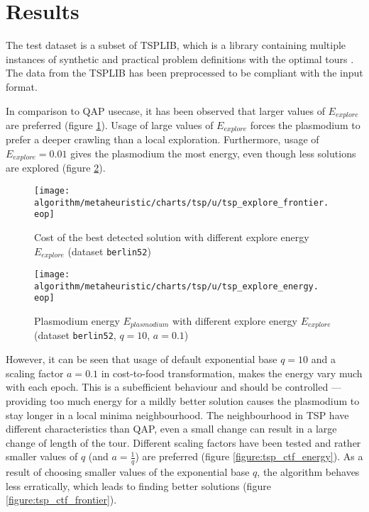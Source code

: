 \section*{Results}

The test dataset is a subset of TSPLIB, which is a library containing multiple instances of synthetic and practical problem definitions with the optimal tours \cite{reinhelt2014tsplib}. The data from the TSPLIB has been preprocessed to be compliant with the input format.

In comparison to QAP usecase, it has been observed that larger values of $E_{explore}$ are preferred (figure \ref{figure:tsp_explore_frontier}). Usage of large values of $E_{explore}$ forces the plasmodium to prefer a deeper crawling than a local exploration. Furthermore, usage of $E_{explore}=0.01$ gives the plasmodium the most energy, even though less solutions are explored (figure \ref{figure:tsp_explore_energy}).

\begin{figure}
  \centering

  \texttt{[image: algorithm/metaheuristic/charts/tsp/u/tsp\_explore\_frontier.\\eop]}

  \caption{Cost of the best detected solution with different explore energy $E_{explore}$ (dataset \texttt{berlin52})}
  \label{figure:tsp_explore_frontier}
\end{figure}

\begin{figure}
  \centering

  \texttt{[image: algorithm/metaheuristic/charts/tsp/u/tsp\_explore\_energy.\\eop]}

  \caption{Plasmodium energy $E_{plasmodium}$ with different explore energy $E_{explore}$ (dataset \texttt{berlin52}, $q=10$, $a=0.1$)}
  \label{figure:tsp_explore_energy}
\end{figure}

However, it can be seen that usage of default exponential base $q=10$ and a scaling factor $a=0.1$ in cost-to-food transformation, makes the energy vary much with each epoch. This is a subefficient behaviour and should be controlled --- providing too much energy for a mildly better solution causes the plasmodium to stay longer in a local minima neighbourhood. The neighbourhood in TSP have different characteristics than QAP, even a small change can result in a large change of length of the tour. Different scaling factors have been tested and rather smaller values of $q$ (and $a=\frac{1}{q}$) are preferred (figure \ref{figure:tsp_ctf_energy}). As a result of choosing smaller values of the exponential base $q$, the algorithm behaves less erratically, which leads to finding better solutions (figure \ref{figure:tsp_ctf_frontier}). 

